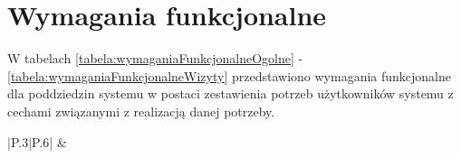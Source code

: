 \section{Wymagania funkcjonalne}\label{sec:functional-requirements}
\par
W tabelach \ref{tabela:wymaganiaFunkcjonalneOgolne} - \ref{tabela:wymaganiaFunkcjonalneWizyty} przedstawiono wymagania funkcjonalne dla poddziedzin systemu w postaci zestawienia potrzeb użytkowników systemu z cechami związanymi z realizacją danej potrzeby.

\begin{minipage}{\textwidth}
    \begin{table}[H]
        \centering\caption{Wymagania funkcjonalne - poddziedzina administracyjna (opr.wł)\label{tabela:wymaganiaFunkcjonalneOgolne}}
        \begin{tabular}{|P{.3\textwidth}|P{.6\textwidth}|}
            \hline
             &  \\


\end{tabular}
\end{table}
\end{minipage}
